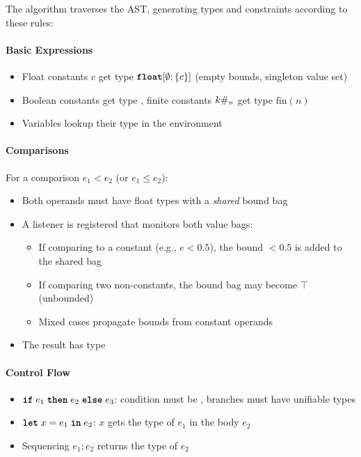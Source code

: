 The algorithm traverses the AST, generating types and constraints according to these rules:

\paragraph{Basic Expressions}
\begin{itemize}
    \item Float constants $c$ get type $\text{\ttfamily\bfseries float}[\emptyset; \{c\}]$ (empty bounds, singleton value set)
    \item Boolean constants get type \bool{}, finite constants $k\#_{n}$ get type $\text{fin}(n)$
    \item Variables lookup their type in the environment
\end{itemize}

\paragraph{Comparisons} For a comparison $e_1 < e_2$ (or $e_1 \leq e_2$):
\begin{itemize}
    \item Both operands must have float types with a \emph{shared} bound bag
    \item A listener is registered that monitors both value bags:
    \begin{itemize}
        \item If comparing to a constant (e.g., $e < 0.5$), the bound $<0.5$ is added to the shared bag
        \item If comparing two non-constants, the bound bag may become $\top$ (unbounded)
        \item Mixed cases propagate bounds from constant operands
    \end{itemize}
    \item The result has type \bool{}
\end{itemize}

\paragraph{Control Flow}
\begin{itemize}
    \item $\text{\ttfamily\bfseries if} \; e_1\; \text{\ttfamily\bfseries then} \; e_2\; \text{\ttfamily\bfseries else} \; e_3$: condition must be \bool{}, branches must have unifiable types
    \item $\text{\ttfamily\bfseries let} \; x = e_1 \; \text{\ttfamily\bfseries in} \; e_2$: $x$ gets the type of $e_1$ in the body $e_2$
    \item Sequencing $e_1; e_2$ returns the type of $e_2$
\end{itemize}

